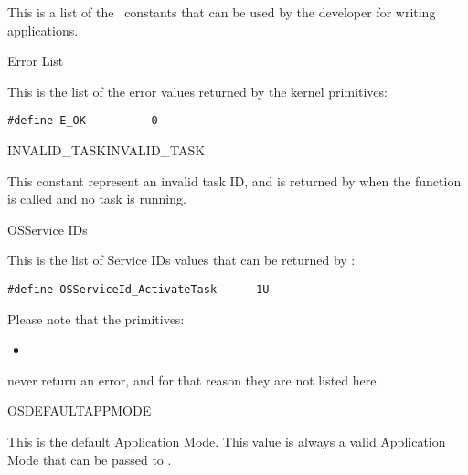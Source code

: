 This is a list of the \ee\ constants that can be used by the developer
for writing applications.

\begin{constant}{Error List}
  \begin{constantdescription}
    This is the list of the error values returned by the kernel primitives:
    \begin {lstlisting}
#define E_OK          0
    \end{lstlisting}
  \end{constantdescription}
\end{constant}

\begin{constant2}{INVALID\_TASK}{INVALID_TASK}
  \begin{constantdescription}
    This constant represent an invalid task ID, and is returned by
     when the function is called and no task is
    running.
  \end{constantdescription}
\end{constant2}

\begin{constant}{OSService IDs}
  \begin{constantdescription}
    This is the list of Service IDs values that can be returned by
    :
    \begin {lstlisting}
#define OSServiceId_ActivateTask      1U
    \end{lstlisting}
    Please note that the primitives:
    \begin{itemize}                              \vspace{-2mm}
      \item {}        \vspace{-2mm}
    \end{itemize}
    never return an error, and for that reason they are not listed
    here.
  \end{constantdescription}
\end{constant}

\begin{constant}{OSDEFAULTAPPMODE}
  \begin{constantdescription}
    This is the default Application Mode. This value is always a valid
    Application Mode that can be passed to .
  \end{constantdescription}
\end{constant}


